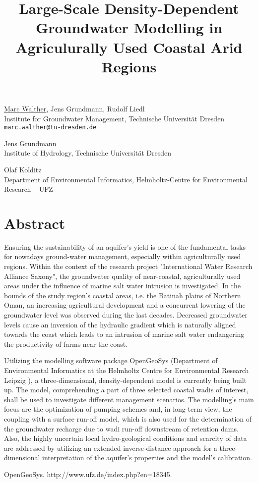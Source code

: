 \title{Large-Scale Density-Dependent Groundwater Modelling in Agriculurally Used Coastal Arid Regions}
\author{} \institute{}
\maketitle

\begin{center}
{\large \underline{Marc Walther}, Jens Grundmann, Rudolf Liedl}\\
Institute for Groundwater Management, Technische Universit\"at Dresden\\
{\tt marc.walther@tu-dresden.de}\\
\vspace{4mm}

{\large Jens Grundmann}\\
Institute of Hydrology, Technische Universität Dresden\\
\vspace{4mm}

{\large Olaf Kolditz}\\
Department of Environmental Informatics, Helmholtz-Centre for Environmental Research -- UFZ
\end{center}

\section*{Abstract}
Ensuring the sustainability of an aquifer's yield is one of the fundamental tasks for nowadays ground-water management, especially within agriculturally used regions. Within the context of the research project "International Water Research Alliance Saxony", the groundwater quality of near-coastal, agriculturally used areas under the influence of marine salt water intrusion is investigated. In the bounds of the study region's coastal areas, i.e. the Batinah plains of Northern Oman, an increasing agricultural development and a concurrent lowering of the groundwater level was observed during the last decades. Decreased groundwater levels cause an inversion of the hydraulic gradient which is naturally aligned towards the coast which leads to an intrusion of marine salt water endangering the productivity of farms near the coast.

Utilizing the modelling software package OpenGeoSys (Department of Environmental Informatics at the Helmholtz Centre for Environmental Research Leipzig \cite{walther1}), a three-dimensional, density-dependent model is currently being built up. The model, comprehending a part of three selected coastal wadis of interest, shall be used to investigate different management scenarios. The modelling's main focus are the optimization of pumping schemes and, in long-term view, the coupling with a surface run-off model, which is also used for the determination of the groundwater recharge due to wadi run-off downstream of retention dams. Also, the highly uncertain local hydro-geological conditions and scarcity of data are addressed by utilizing an extended inverse-distance approach for a three-dimensional interpretation of the aquifer's properties and the model's calibration.


\begin{thebibliography}{10}
{\sc OpenGeoSys}. {http://www.ufz.de/index.php?en=18345}.
\end{thebibliography}
